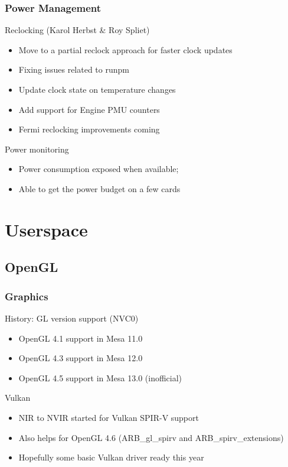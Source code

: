 \documentclass[11pt,english,compress]{beamer}
\begin{document}
\begin{frame}
	\frametitle{Power Management}

	\begin{block}{Reclocking (Karol Herbst \& Roy Spliet)}
		\begin{itemize}
			\item Move to a partial reclock approach for faster clock updates
			\item Fixing issues related to runpm
			\item Update clock state on temperature changes
			\item Add support for Engine PMU counters
			\item Fermi reclocking improvements coming
		\end{itemize}
	\end{block}

	\begin{block}{Power monitoring}
		\begin{itemize}
			\item Power consumption exposed when available;
			\item Able to get the power budget on a few cards
		\end{itemize}
	\end{block}
\end{frame}

\section{Userspace}
\subsection{OpenGL}

\begin{frame}
	\frametitle{Graphics}

	\begin{block}{History: GL version support (NVC0)}
		\begin{itemize}
			\item OpenGL 4.1 support in Mesa 11.0
			\item OpenGL 4.3 support in Mesa 12.0
			\item OpenGL 4.5 support in Mesa 13.0 (inofficial)
		\end{itemize}
	\end{block}
	
	\pause
	
	\begin{block}{Vulkan}
		\begin{itemize}
			\item NIR to NVIR started for Vulkan SPIR-V support
			\item Also helps for OpenGL 4.6 (ARB\_gl\_spirv and ARB\_spirv\_extensions)
			\item Hopefully some basic Vulkan driver ready this year
		\end{itemize}
	\end{block}
\end{frame}
\end{document}
